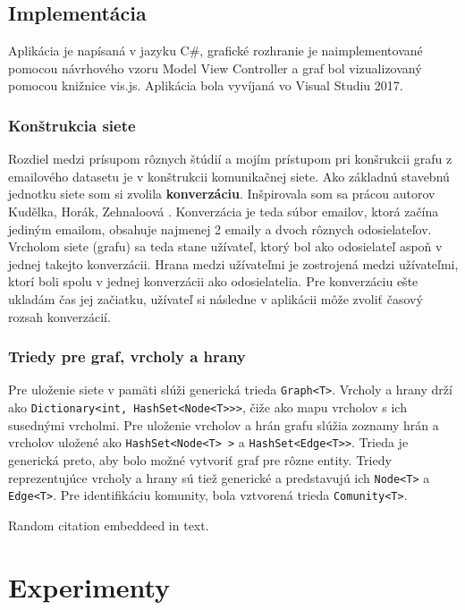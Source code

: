 \documentclass[slovak,master,public,dept460,male,cpdeclaration,oneside]{diploma}
\begin{document}
\subsection{Implementácia}
Aplikácia je napísaná v jazyku C\#, grafické rozhranie je naimplementované pomocou návrhového vzoru Model View Controller a graf bol vizualizovaný pomocou knižnice vis.js. Aplikácia bola vyvíjaná vo Visual Studiu 2017.

\subsubsection{Konštrukcia siete}
Rozdiel medzi prísupom rôznych štúdií a mojím prístupom pri konšrukcii grafu z emailového datasetu je v konštrukcii komunikačnej siete. Ako základnú stavebnú jednotku siete som si zvolila \textbf{konverzáciu}. Inšpirovala som sa prácou autorov Kudělka, Horák, Zehnaloová \cite{10}. Konverzácia je teda súbor emailov, ktorá začína jediným emailom, obsahuje najmenej 2 emaily a dvoch rôznych odosielateľov. Vrcholom siete (grafu) sa teda stane užívateľ, ktorý bol ako odosielateľ aspoň v jednej takejto konverzácii. Hrana medzi užívateľmi je zostrojená medzi užívateľmi, ktorí boli spolu v jednej konverzácii ako odosielatelia. Pre konverzáciu ešte ukladám čas jej začiatku, užívateľ si následne v aplikácii môže zvoliť časový rozsah konverzácií.

\subsubsection{Triedy pre graf, vrcholy a hrany}
Pre uloženie siete v pamäti slúži generická trieda \texttt{Graph<T>}. Vrcholy a hrany drží ako \texttt{Dictionary<int, HashSet<Node<T>{}>{}>}, čiže ako mapu vrcholov s ich susednými vrcholmi. Pre uloženie vrcholov a hrán grafu slúžia zoznamy hrán a vrcholov uložené ako \texttt{HashSet<Node<T> >} a \texttt{HashSet<Edge<T>{}>}. Trieda je generická preto, aby bolo možné vytvoriť graf pre rôzne entity. Triedy reprezentujúce vrcholy a hrany sú tiež generické a predstavujú ich \texttt{Node<T>} a \texttt{Edge<T>}. Pre identifikáciu komunity, bola vztvorená trieda \texttt{Comunity<T>}.



Random citation \cite{DUMMY:1} embeddeed in text.

\section{Experimenty}
\end{document}
